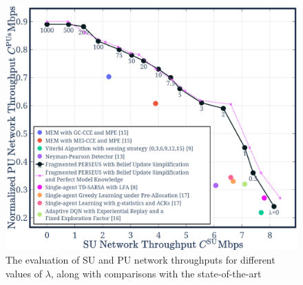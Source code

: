 \documentclass[12pt, draftcls, onecolumn]{IEEEtran}
\begin{document}
\begin{figure} [t]
    \centerline{
    \includegraphics[width = 1.0\linewidth]{figures/Minerva_SoA_Performance_Comparisons_v10.png}}
    \vspace{-6mm}
    \caption{The evaluation of SU and PU network throughputs for different values of $\lambda$, along with comparisons with the state-of-the-art}
    \vspace{-7mm}
    \label{Fig. 4}
\end{figure}
\end{document}
